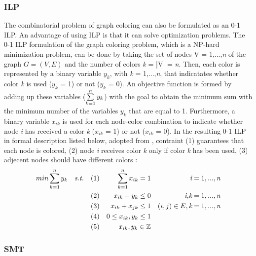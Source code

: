 \documentclass{sig-alternate}
\begin{document}
\subsubsection{ILP}
The combinatorial problem of graph coloring can also be formulated as an 0-1 ILP. An advantage of using ILP is that it can solve optimization problems. The 0-1 ILP formulation of the graph coloring problem, which is a NP-hard minimization problem, can be done by taking the set of nodes V = {1,...,\emph{n}} of the graph $G = (V,E)$ and the number of colors \emph{k} = |V| = \emph{n}. Then, each color is represented by a binary variable \emph{$y_k$}, with \emph{k} = 1,...,\emph{n}, that indicatates whether color \emph{k} is used (\emph{$y_k$} = 1) or not (\emph{$y_k$} = 0). An objective function is formed by adding up these variables ($\sum\limits_{k=1}^n \emph{$y_k$}$) with the goal to obtain the minimum sum with the minimum number of the variables \emph{$y_k$} that are equal to 1. Furthermore, a binary variable \emph{$x_{ik}$} is used for each node-color combination to indicate whether node \emph{i} has received a color \emph{k} (\emph{$x_{ik}$} = 1) or not (\emph{$x_{ik}$} = 0). In the resulting 0-1 ILP in formal description listed below, adopted from \cite{faigle2002mathprogramming}, contraint (1) guarantees that each node is colored, (2) node \emph{i} receives color \emph{k} only if color \emph{k} has been used, (3) adjecent nodes should have different colors :
\begin{subequations}
\begin{align*}
        & min \sum\limits_{k=1}^n \emph{$y_k$} & \emph{s.t.} & & (1) & & \sum\limits_{k=1}^n \emph{$x_{ik}$} = 1 & & \emph{i} = 1,...,\emph{n} \\
        &  & & & (2) & & \emph{$x_{ik}$} - \emph{$y_k$} \leq 0 & & \emph{i,k} = 1,...,\emph{n} \\
        &  & & & (3) & &  \emph{$x_{ik}$} + \emph{$x_{jk}$} \leq 1 & & (i,j) \in E, \emph{k} = 1,...,\emph{n} \\
        &  & & & (4) & & 0 \leq \emph{$x_{ik}$}, \emph{$y_k$} \leq 1 & & \\
        &  & & & (5) & & \emph{$x_{ik}$}, \emph{$y_k$} \in \mathbb{Z} & &
\end{align*}
\end{subequations}

\subsubsection{SMT}
\end{document}
